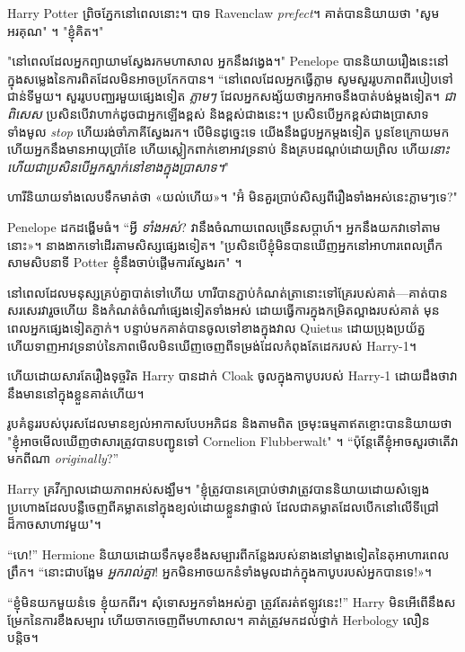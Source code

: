{{Harry Potter ព្រិចភ្នែកនៅពេលនោះ។ បាទ Ravenclaw \emph{prefect}។ គាត់បាននិយាយថា "សូមអរគុណ" ។ "ខ្ញុំគិត។"

"នៅពេលដែលអ្នកព្យាយាមស្វែងរកមហាសាល អ្នកនឹងវង្វេង។" Penelope បាននិយាយរឿងនេះនៅក្នុងសម្លេងនៃការពិតដែលមិនអាចប្រកែកបាន។ “នៅពេលដែលអ្នកធ្វើភ្លាម សូមសួររូបភាពពីរបៀបទៅជាន់ទីមួយ។ សួររូបបញ្ឈរមួយផ្សេងទៀត \emph{ភ្លាមៗ} ដែលអ្នកសង្ស័យថាអ្នកអាចនឹងបាត់បង់ម្តងទៀត។ \emph{ជាពិសេស} ប្រសិនបើវាហាក់ដូចជាអ្នកឡើងខ្ពស់ និងខ្ពស់ជាងនេះ។ ប្រសិនបើអ្នកខ្ពស់ជាងប្រាសាទទាំងមូល \emph{stop} ហើយរង់ចាំភាគីស្វែងរក។ បើមិនដូច្នេះទេ យើងនឹងជួបអ្នកម្តងទៀត បួនខែក្រោយមក ហើយអ្នកនឹងមានអាយុប្រាំខែ ហើយស្លៀកពាក់ខោអាវទ្រនាប់ និងគ្របដណ្តប់ដោយព្រិល ហើយ\emph{នោះហើយជាប្រសិនបើអ្នកស្នាក់នៅខាងក្នុងប្រាសាទ។}"

ហារី​និយាយ​ទាំង​លេប​ទឹក​មាត់​ថា «យល់​ហើយ»។ "អ៊ំ មិនគួរប្រាប់សិស្សពីរឿងទាំងអស់នេះភ្លាមៗទេ?"

Penelope ដកដង្ហើមធំ។ “អ្វី \emph{ទាំងអស់}? វានឹងចំណាយពេលច្រើនសប្តាហ៍។ អ្នក​នឹង​យក​វា​ទៅ​តាម​នោះ»។ នាងងាកទៅដើរតាមសិស្សផ្សេងទៀត។ "ប្រសិនបើខ្ញុំមិនបានឃើញអ្នកនៅអាហារពេលព្រឹកសាមសិបនាទី Potter ខ្ញុំនឹងចាប់ផ្តើមការស្វែងរក" ។

នៅពេលដែលមនុស្សគ្រប់គ្នាបាត់ទៅហើយ ហារីបានភ្ជាប់កំណត់ត្រានោះទៅគ្រែរបស់គាត់—គាត់បានសរសេរវារួចហើយ និងកំណត់ចំណាំផ្សេងទៀតទាំងអស់ ដោយធ្វើការក្នុងកម្រិតល្អាងរបស់គាត់ មុនពេលអ្នកផ្សេងទៀតភ្ញាក់។ បន្ទាប់មកគាត់បានចូលទៅខាងក្នុងវាល Quietus ដោយប្រុងប្រយ័ត្ន ហើយទាញអាវទ្រនាប់នៃភាពមើលមិនឃើញចេញពីទម្រង់ដែលកំពុងតែដេករបស់ Harry-1។

ហើយ​ដោយ​សារ​តែ​រឿង​ទុច្ចរិត Harry បាន​ដាក់ Cloak ចូល​ក្នុង​កាបូប​របស់ Harry-1 ដោយ​ដឹង​ថា​វា​នឹង​មាន​នៅ​ក្នុង​ខ្លួន​គាត់​ហើយ។

\later

រូបគំនូររបស់បុរសដែលមានខ្យល់អាកាសបែបអភិជន និងតាមពិត ច្រមុះធម្មតាឥតខ្ចោះបាននិយាយថា "ខ្ញុំអាចមើលឃើញថាសារត្រូវបានបញ្ជូនទៅ Cornelion Flubberwalt" ។ “ប៉ុន្តែតើខ្ញុំអាចសួរថាតើវាមកពីណា \emph{originally}?”

Harry គ្រវីក្បាលដោយភាពអស់សង្ឃឹម។ "ខ្ញុំត្រូវបានគេប្រាប់ថាវាត្រូវបាននិយាយដោយសំឡេងប្រហោងដែលបន្លឺចេញពីគម្លាតនៅក្នុងខ្យល់ដោយខ្លួនវាផ្ទាល់ ដែលជាគម្លាតដែលបើកនៅលើទីជ្រៅដ៏កាចសាហាវមួយ"។

\later

“ហេ!” Hermione និយាយដោយទឹកមុខខឹងសម្បារពីកន្លែងរបស់នាងនៅម្ខាងទៀតនៃតុអាហារពេលព្រឹក។ “នោះជាបង្អែម \emph{អ្នករាល់គ្នា}! អ្នក​មិន​អាច​យក​នំ​ទាំងមូល​ដាក់​ក្នុង​កាបូប​របស់​អ្នក​បាន​ទេ!»។

“ខ្ញុំមិនយកមួយនំទេ ខ្ញុំយកពីរ។ សុំទោសអ្នកទាំងអស់គ្នា ត្រូវតែរត់ឥឡូវនេះ!” Harry មិនអើពើនឹងសម្រែកនៃការខឹងសម្បារ ហើយចាកចេញពីមហាសាល។ គាត់ត្រូវមកដល់ថ្នាក់ Herbology លឿនបន្តិច។

}}
